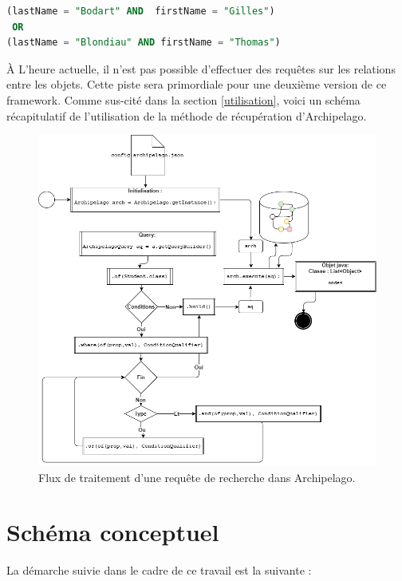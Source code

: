 \documentclass[a4paper,fleqn,12pt,oneside]{report}
\begin{document}
\begin{lstlisting}[language=SQL]
(lastName = "Bodart" AND  firstName = "Gilles") 
 OR 
(lastName = "Blondiau" AND firstName = "Thomas")
\end{lstlisting}
\label{badCondition}
\`A L'heure actuelle, il n'est pas possible d'effectuer des requêtes sur les relations entre les objets. Cette piste sera primordiale pour une deuxième version de ce framework.
\newpage
Comme sus-cité dans la section \ref{utilisation}, voici un schéma récapitulatif de l'utilisation de la méthode de récupération d'Archipelago.
\begin{figure}[!ht]
\centering
\includegraphics[scale=0.6]{figures/query.png}
\caption{Flux de traitement d'une requête de recherche dans Archipelago.}
\label{fig:Query}
\end{figure}


\newpage


\section{Schéma conceptuel}

La démarche suivie dans le cadre de ce travail est la suivante :
\end{document}
